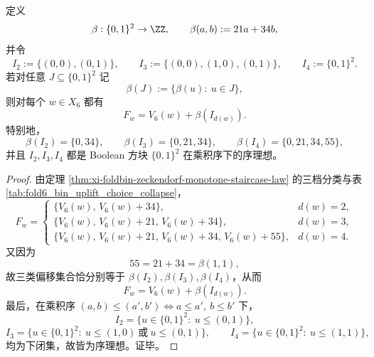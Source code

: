 \begin{theorem}\label{thm:xi-time-part9xab-window6-hidden-fiber-affine-boolean-normal-form}
定义
\[
\beta:\{0,1\}^2\to \ZZ,
\qquad
\beta(a,b):=21a+34b,
\]
并令
\[
I_2:=\{(0,0),(0,1)\},
\qquad
I_3:=\{(0,0),(1,0),(0,1)\},
\qquad
I_4:=\{0,1\}^2.
\]
若对任意 \(J\subseteq \{0,1\}^2\) 记
\[
\beta(J):=\{\beta(u):\ u\in J\},
\]
则对每个 \(w\in X_6\) 都有
\[
F_w=V_6(w)+\beta(I_{d(w)}).
\]
特别地，
\[
\beta(I_2)=\{0,34\},
\qquad
\beta(I_3)=\{0,21,34\},
\qquad
\beta(I_4)=\{0,21,34,55\},
\]
并且 \(I_2,I_3,I_4\) 都是 Boolean 方块 \(\{0,1\}^2\) 在乘积序下的序理想。
\end{theorem}
\begin{proof}
由定理 \ref{thm:xi-foldbin-zeckendorf-monotone-staircase-law} 的三档分类与表 \ref{tab:fold6_bin_uplift_choice_collapse}，
\[
F_w=
\begin{cases}
\{V_6(w),\,V_6(w)+34\}, & d(w)=2,\\[4pt]
\{V_6(w),\,V_6(w)+21,\,V_6(w)+34\}, & d(w)=3,\\[4pt]
\{V_6(w),\,V_6(w)+21,\,V_6(w)+34,\,V_6(w)+55\}, & d(w)=4.
\end{cases}
\]
又因为
\[
55=21+34=\beta(1,1),
\]
故三类偏移集合恰分别等于 \(\beta(I_2),\beta(I_3),\beta(I_4)\)，从而
\[
F_w=V_6(w)+\beta(I_{d(w)}).
\]
最后，在乘积序 \((a,b)\le (a',b')\iff a\le a',\ b\le b'\) 下，
\[
I_2=\{u\in\{0,1\}^2:\ u\le (0,1)\},
\]
\[
I_3=\{u\in\{0,1\}^2:\ u\le (1,0)\ \text{或}\ u\le (0,1)\},
\qquad
I_4=\{u\in\{0,1\}^2:\ u\le (1,1)\},
\]
均为下闭集，故皆为序理想。证毕。
\end{proof}

